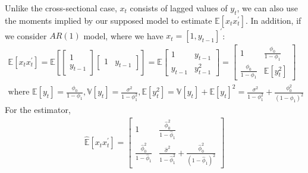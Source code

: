 Unlike the cross-sectional case, $x_t$ consists of lagged values of $y_t$,
we can also use the moments implied by our supposed model to estimate $\mathbb{E}[x_t x_t^{\prime}].$
In addition, if we consider $AR(1)$ model, where we have $x_t = [1, y_{t-1}]^{\prime}$:
\begin{gather*}
    \mathbb{E}[x_t x_t^{\prime}] = \mathbb{E}\left[ \begin{bmatrix}
        1 \\
        y_{t-1}
    \end{bmatrix} \begin{bmatrix}
        1 & y_{t-1} 
    \end{bmatrix} \right] = \mathbb{E} \begin{bmatrix}
        1 & y_{t-1} \\
        y_{t-1} & y_{t-1}^2
    \end{bmatrix} = \begin{bmatrix}
        1 & \frac{\phi_0}{1 - \phi_1} \\
        \frac{\phi_0}{1 - \phi_1} & \mathbb{E}[y_t^2]
    \end{bmatrix} \\
    \text{where } \mathbb{E}[y_t] = \frac{\phi_0}{1 - \phi_1} , \mathbb{V}[y_t] = \frac{\sigma^2}{1 - \phi_1^2}, \mathbb{E}[y_t^2] = \mathbb{V}[y_t] + \mathbb{E}[y_t]^2 = \frac{\sigma^2}{1 - \phi_1^2} + \frac{\phi_0^2}{(1 - \phi_1)^2}
\end{gather*}
For the estimator, 
\begin{gather*}
    \hat{\mathbb{E}}[x_t x_t^{\prime}] = \begin{bmatrix}
        1 & \frac{\hat{\phi}_0^2}{1 - \hat{\phi}_1} \\
        \frac{\hat{\phi}_0^2}{1 - \hat{\phi}_1} & \frac{\hat{\sigma}^2}{1 - \hat{\phi}_1^2} + \frac{\hat{\phi}_0^2}{(1 - \hat{\phi}_1)^2}
    \end{bmatrix}
\end{gather*}

